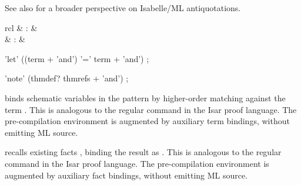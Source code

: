 \begin{isabellebody}
\begin{isamarkuptext}
  \medskip See also \cite{Wenzel-Chaieb:2007b} for a broader
  perspective on Isabelle/ML antiquotations.%
\end{isamarkuptext}%
\isamarkuptrue%
%
\isadelimmlantiq
%
\endisadelimmlantiq
%
\isatagmlantiq
%
\begin{isamarkuptext}%
\begin{matharray}{rcl}
  \hypertarget{ML antiquotation.let}{\hyperlink{ML antiquotation.let}{\mbox{}}} & : &  \\
  \hypertarget{ML antiquotation.note}{\hyperlink{ML antiquotation.note}{\mbox{}}} & : &  \\
  \end{matharray}

  \begin{rail}
  'let' ((term + 'and') '=' term + 'and')
  ;

  'note' (thmdef? thmrefs + 'and')
  ;
  \end{rail}

  \begin{description}

  \item {} binds schematic variables in the
  pattern  by higher-order matching against the term .  This is analogous to the regular \hyperlink{command.let}{\mbox{}} command
  in the Isar proof language.  The pre-compilation environment is
  augmented by auxiliary term bindings, without emitting ML source.

  \item {} recalls existing facts , binding the result as .  This is analogous to
  the regular \hyperlink{command.note}{\mbox{}} command in the Isar proof language.
  The pre-compilation environment is augmented by auxiliary fact
  bindings, without emitting ML source.


\end{description}
\end{isamarkuptext}
\end{isabellebody}

